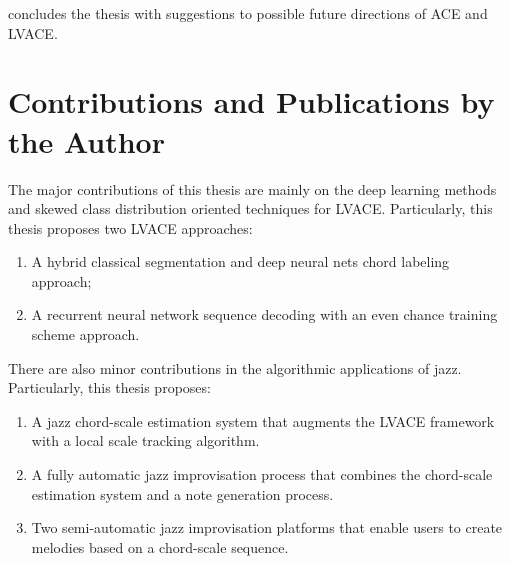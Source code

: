  concludes the thesis with suggestions to possible future directions of ACE and LVACE.


\section{Contributions and Publications by the Author} \label{sec:1-contribution}
The major contributions of this thesis are mainly on the deep learning methods and skewed class distribution oriented techniques for LVACE. Particularly, this thesis proposes two LVACE approaches:
\begin{enumerate}
\item A hybrid classical segmentation and deep neural nets chord labeling approach;
\item A recurrent neural network sequence decoding with an even chance training scheme approach.
\end{enumerate}

There are also minor contributions in the algorithmic applications of jazz. Particularly, this thesis proposes:
\begin{enumerate}
\item A jazz chord-scale estimation system that augments the LVACE framework with a local scale tracking algorithm.
\item A fully automatic jazz improvisation process that combines the chord-scale estimation system and a note generation process.
\item Two semi-automatic jazz improvisation platforms that enable users to create melodies based on a chord-scale sequence.
\end{enumerate}

